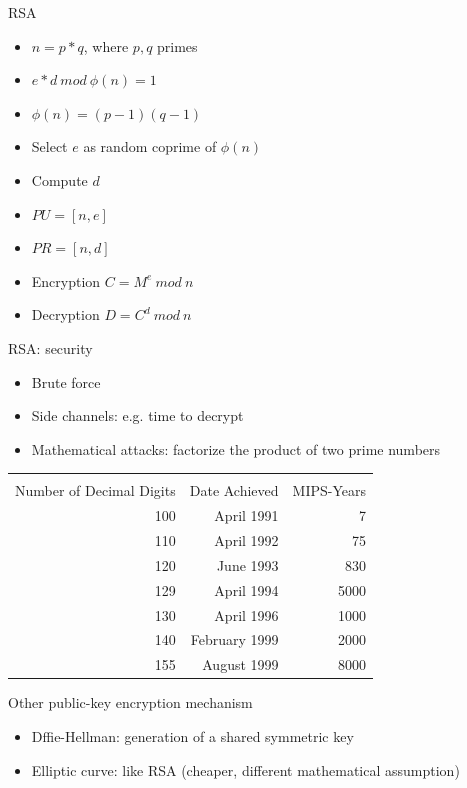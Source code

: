 \documentclass{beamer}
\begin{document}
\begin{frame}{RSA}
  \begin{itemize}
    \item $n=p*q$, where $p,q$ primes 
    \item $e*d\ mod\ \phi(n) = 1$
    \item $\phi(n) = (p-1)(q-1)$
    \item Select $e$ as random coprime of $\phi(n)$
    \item Compute $d$
    \item $PU = [n,e]$ 
    \item $PR = [n,d]$
    \item Encryption $C = M^e\ mod\ n$
    \item Decryption $D = C^d\ mod\ n$
  \end{itemize}
\end{frame}

\begin{frame}{RSA: security}
  \begin{itemize}
    \item Brute force 
    \item Side channels: e.g. time to decrypt
    \item Mathematical attacks: factorize the product of two prime numbers
  \end{itemize}
  \begin{center}
    \begin{tabular}{|r|r|r|}
      \hline\\
  Number of Decimal Digits &
  Date Achieved & MIPS-Years\\
  \hline
 100 & April 1991 & 7 \\ 
 110 & April 1992 & 75\\
 120 & June 1993 & 830\\
 129 & April 1994 & 5000\\
 130 & April 1996 & 1000\\
 140 & February 1999 & 2000\\
 155 & August 1999 & 8000\\
 \hline
 \end{tabular}
  \end{center}
\end{frame}


\begin{frame}{Other public-key encryption mechanism}
  \begin{itemize}
    \item Dffie-Hellman: generation of a shared symmetric key 
    \item Elliptic curve: like RSA (cheaper, different mathematical assumption)
  \end{itemize}
\end{frame}
\end{document}
